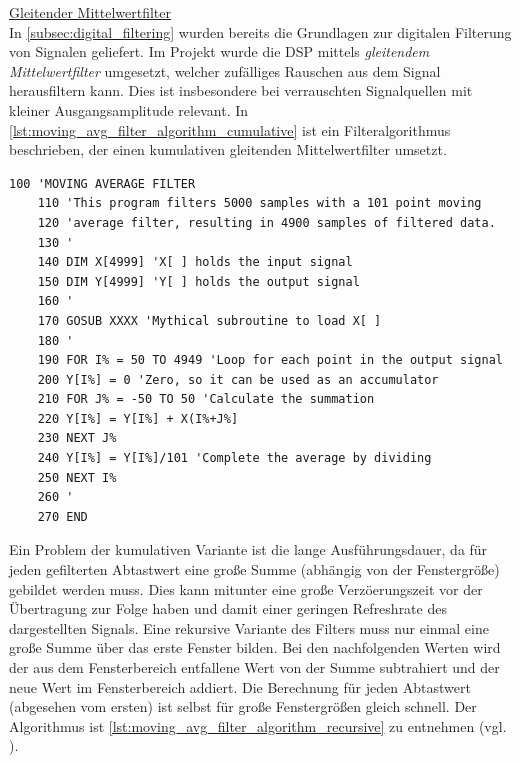 \documentclass[a4paper, portrait, 12pt]{scrartcl} %
\begin{document}
\underline{Gleitender Mittelwertfilter}\\
In \autoref{subsec:digital_filtering} wurden bereits die Grundlagen zur digitalen Filterung von Signalen geliefert. Im Projekt wurde die DSP mittels \emph{gleitendem Mittelwertfilter} umgesetzt, welcher zufälliges Rauschen aus dem Signal herausfiltern kann. Dies ist insbesondere bei verrauschten Signalquellen mit kleiner Ausgangsamplitude relevant. In \autoref{lst:moving_avg_filter_algorithm_cumulative} ist ein Filteralgorithmus beschrieben, der einen kumulativen gleitenden Mittelwertfilter umsetzt.


\begin{lstlisting}[style=plaintextstyle,caption={Pseudocode: Kumulativer Moving-Average-Filter aus \protect{\cite[S. 278]{Smith1999}}}, label={lst:moving_avg_filter_algorithm_cumulative}]
	100 'MOVING AVERAGE FILTER
	110 'This program filters 5000 samples with a 101 point moving
	120 'average filter, resulting in 4900 samples of filtered data.
	130 '
	140 DIM X[4999] 'X[ ] holds the input signal
	150 DIM Y[4999] 'Y[ ] holds the output signal
	160 '
	170 GOSUB XXXX 'Mythical subroutine to load X[ ]
	180 '
	190 FOR I% = 50 TO 4949 'Loop for each point in the output signal
	200 Y[I%] = 0 'Zero, so it can be used as an accumulator
	210 FOR J% = -50 TO 50 'Calculate the summation
	220 Y[I%] = Y[I%] + X(I%+J%]
	230 NEXT J%
	240 Y[I%] = Y[I%]/101 'Complete the average by dividing
	250 NEXT I%
	260 '
	270 END
\end{lstlisting}

Ein Problem der kumulativen Variante ist die lange Ausführungsdauer, da für jeden gefilterten Abtastwert eine große Summe (abhängig von der Fenstergröße) gebildet werden muss. Dies kann mitunter eine große Verzöerungszeit vor der Übertragung zur Folge haben und damit einer geringen Refreshrate des dargestellten Signals. Eine rekursive Variante des Filters muss nur einmal eine große Summe über das erste Fenster bilden. Bei den nachfolgenden Werten wird der aus dem Fensterbereich entfallene Wert von der Summe subtrahiert und der neue Wert im Fensterbereich addiert. Die Berechnung für jeden Abtastwert (abgesehen vom ersten) ist selbst für große Fenstergrößen gleich schnell. Der Algorithmus ist \autoref{lst:moving_avg_filter_algorithm_recursive} zu entnehmen (vgl. \cite[S. 277-284]{Smith1999}).
\end{document}
